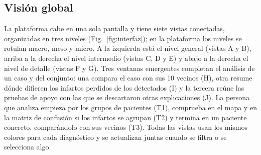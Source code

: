 \documentclass[conference]{IEEEtran}
\begin{document}
\subsection{Visión global}
La plataforma cabe en una sola pantalla y tiene siete vistas conectadas, organizadas en tres niveles (Fig.~\ref{fig:interfaz}); en la plataforma los niveles se rotulan macro, meso y micro. A la izquierda está el nivel general (vistas A y B), arriba a la derecha el nivel intermedio (vistas C, D y E) y abajo a la derecha el nivel de detalle (vistas F y G). Tres ventanas emergentes completan el análisis de un caso y del conjunto: una compara el caso con sus 10 vecinos (H), otra resume dónde difieren los infartos perdidos de los detectados (I) y la tercera reúne las pruebas de apoyo con las que se descartaron otras explicaciones (J). La persona que analiza empieza por los grupos de pacientes (T1), comprueba en el mapa y en la matriz de confusión si los infartos se agrupan (T2) y termina en un paciente concreto, comparándolo con sus vecinos (T3). Todas las vistas usan los mismos colores para cada diagnóstico y se actualizan juntas cuando se filtra o se selecciona algo.
\end{document}
